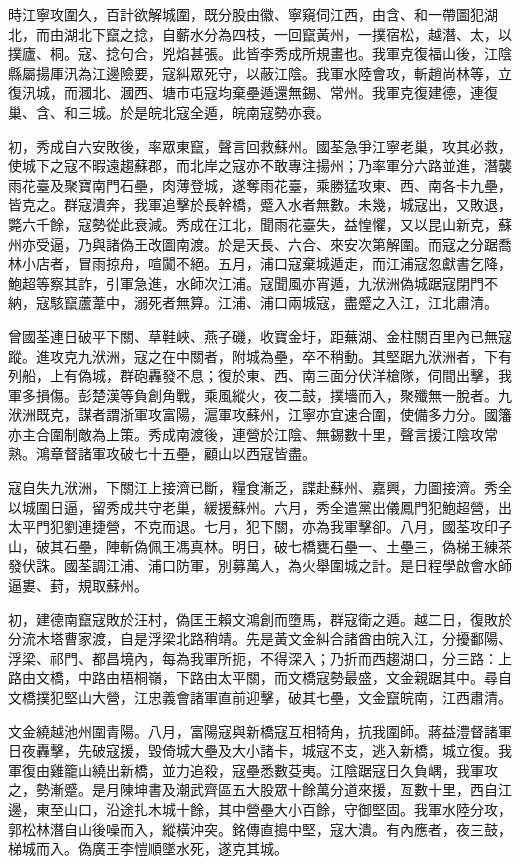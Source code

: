 \begin{pinyinscope}
時江寧攻圍久，百計欲解城圍，既分股由徽、寧窺伺江西，由含、和一帶圖犯湖北，而由湖北下竄之捻，自蘄水分為四枝，一回竄黃州，一撲宿松，越潛、太，以撲廬、桐。寇、捻句合，兇焰甚張。此皆李秀成所規畫也。我軍克復福山後，江陰縣屬揚厙汛為江邊險要，寇糾眾死守，以蔽江陰。我軍水陸會攻，斬趙尚林等，立復汛城，而漍北、漍西、塘市屯寇均棄壘遁還無錫、常州。我軍克復建德，連復巢、含、和三城。於是皖北寇全遁，皖南寇勢亦衰。

初，秀成自六安敗後，率眾東竄，聲言回救蘇州。國荃急爭江寧老巢，攻其必救，使城下之寇不暇遠趨蘇郡，而北岸之寇亦不敢專注揚州；乃率軍分六路並進，潛襲雨花臺及聚寶南門石壘，肉薄登城，遂奪雨花臺，乘勝猛攻東、西、南各卡九壘，皆克之。群寇潰奔，我軍追擊於長幹橋，蹙入水者無數。未幾，城寇出，又敗退，斃六千餘，寇勢從此衰減。秀成在江北，聞雨花臺失，益惶懼，又以昆山新克，蘇州亦受逼，乃與諸偽王改圖南渡。於是天長、六合、來安次第解圍。而寇之分踞喬林小店者，冒雨掠舟，喧闐不絕。五月，浦口寇棄城遁走，而江浦寇忽獻書乞降，鮑超等察其詐，引軍急進，水師次江浦。寇聞風亦宵遁，九洑洲偽城踞寇閉門不納，寇駭竄蘆葦中，溺死者無算。江浦、浦口兩城寇，盡蹙之入江，江北肅清。

曾國荃連日破平下關、草鞋峽、燕子磯，收寶金圩，距蕪湖、金柱關百里內已無寇蹤。進攻克九洑洲，寇之在中關者，附城為壘，卒不稍動。其堅踞九洑洲者，下有列船，上有偽城，群砲轟發不息；復於東、西、南三面分伏洋槍隊，伺間出擊，我軍多損傷。彭楚漢等負創角戰，乘風縱火，夜二鼓，撲墻而入，聚殲無一脫者。九洑洲既克，謀者謂浙軍攻富陽，滬軍攻蘇州，江寧亦宜速合圍，使備多力分。國籓亦主合圍制敵為上策。秀成南渡後，連營於江陰、無錫數十里，聲言援江陰攻常熟。鴻章督諸軍攻破七十五壘，顧山以西寇皆盡。

寇自失九洑洲，下關江上接濟已斷，糧食漸乏，諜赴蘇州、嘉興，力圖接濟。秀全以城圍日逼，留秀成共守老巢，緩援蘇州。六月，秀全遣黨出儀鳳門犯鮑超營，出太平門犯劉連捷營，不克而退。七月，犯下關，亦為我軍擊卻。八月，國荃攻印子山，破其石壘，陣斬偽佩王馮真林。明日，破七橋甕石壘一、土壘三，偽梯王練茶發伏誅。國荃調江浦、浦口防軍，別募萬人，為火舉圍城之計。是日程學啟會水師逼婁、葑，規取蘇州。

初，建德南竄寇敗於汪村，偽匡王賴文鴻創而墮馬，群寇衛之遁。越二日，復敗於分流木塔曹家渡，自是浮梁北路稍靖。先是黃文金糾合諸酋由皖入江，分擾鄱陽、浮梁、祁門、都昌境內，每為我軍所扼，不得深入；乃折而西趨湖口，分三路：上路由文橋，中路由梧桐嶺，下路由太平關，而文橋寇勢最盛，文金親踞其中。尋自文橋撲犯堅山大營，江忠義會諸軍直前迎擊，破其七壘，文金竄皖南，江西肅清。

文金繞越池州圍青陽。八月，富陽寇與新橋寇互相犄角，抗我圍師。蔣益澧督諸軍日夜轟擊，先破寇援，毀倚城大壘及大小諸卡，城寇不支，逃入新橋，城立復。我軍復由雞籠山繞出新橋，並力追殺，寇壘悉數芟夷。江陰踞寇日久負嵎，我軍攻之，勢漸蹙。是月陳坤書及潮武齊區五大股眾十餘萬分道來援，亙數十里，西自江邊，東至山口，沿途扎木城十餘，其中營壘大小百餘，守御堅固。我軍水陸分攻，郭松林潛自山後噪而入，縱橫沖突。銘傳直搗中堅，寇大潰。有內應者，夜三鼓，梯城而入。偽廣王李愷順墜水死，遂克其城。


\end{pinyinscope}
